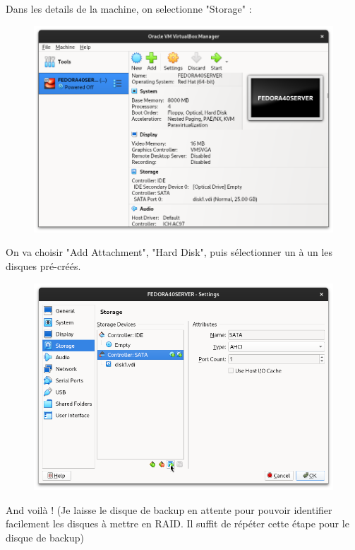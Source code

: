 \documentclass{article}
\begin{document}
Dans les details de la machine, on selectionne "Storage" :

\begin{figure}[h!]
		\centering
		\includegraphics[width=1\textwidth]{vbox20.png}
\end{figure}


\pagebreak

On va choisir "Add Attachment", "Hard Disk", puis sélectionner un à un les disques pré-créés.

\begin{figure}[h!]
		\centering
		\includegraphics[width=1\textwidth]{vbox21.png}
\end{figure}

And voilà ! (Je laisse le disque de backup en attente pour pouvoir identifier facilement les disques à mettre en RAID. Il suffit de répéter cette étape pour le disque de backup)
\end{document}
